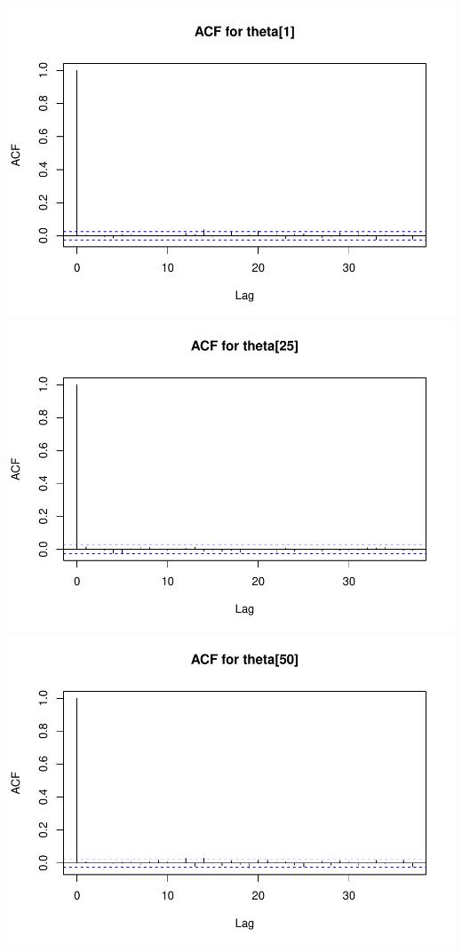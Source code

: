 \documentclass[
  11pt,
]{article}
\begin{document}
\includegraphics{Final-Project_files/figure-latex/appendix-code-2-8.pdf}
\includegraphics{Final-Project_files/figure-latex/appendix-code-2-9.pdf}
\includegraphics{Final-Project_files/figure-latex/appendix-code-2-10.pdf}
\end{document}
